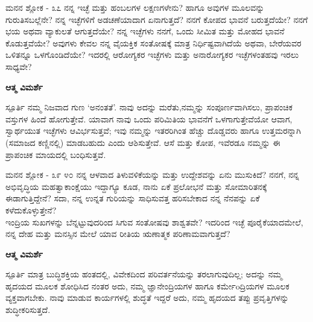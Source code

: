 \begin{mananam}{\mananamfont ಮನನ ಶ್ಲೋಕ - ೩೭}
\mananamtext ನನ್ನ ಇಚ್ಛೆ ಮತ್ತು ಹಂಬಲಗಳ ಲಕ್ಷಣಗಳೇನು? ಹಾಗೂ ಅವುಗಳ ಮೂಲವನ್ನು ಗುರುತಿಸಬಲ್ಲೆನೇ? ನನ್ನ ಇಚ್ಛೆಗಳಿಗೆ ಅಡಚಣೆಯಾದಾಗ ಏನಾಗುತ್ತದೆ? ನನಗೆ ಕೋಪದ ಭಾವನೆ ಬರುತ್ತದೆಯೇ? ನನಗೆ ಭಯ ಅಥವಾ ವ್ಯಾಕುಲತೆ ಆಗುತ್ತದೆಯೇ? ನನ್ನ ಇಚ್ಛೆಗಳು ನನಗೆ, ಒಂದು ಸೀಮಿತ ಮತ್ತು ಮೋಹದ ಭಾವನೆ ಕೊಡುತ್ತವೆಯೇ? ಅವುಗಳು ಕೇವಲ ನನ್ನ ವೈಯಕ್ತಿಕ ಸಂತೋಷಕ್ಕೆ ಮಾತ್ರ ನಿರ್ಧಿಷ್ಟವಾಗಿದೆಯೆ ಅಥವಾ, ಬೇರೆಯವರ ಒಳಿತನ್ನೂ ಒಳಗೊಂಡಿದೆಯೇ? ಇದರಲ್ಲಿ ಆರೋಗ್ಯಕರ ಇಚ್ಛೆಗಳು ಮತ್ತು ಅನಾರೋಗ್ಯಕರ ಇಚ್ಛೆಗಳಂತಹವು ಇರಲು ಸಾಧ್ಯವೇ? 
\end{mananam}
\WritingHand\enspace\textbf{ಆತ್ಮ ವಿಮರ್ಶೆ}\\
\begin{inspiration}{\mananamfont ಸ್ಪೂರ್ತಿ}
\mananamtext ನಮ್ಮ ನಿಜವಾದ ಗುಣ ‘ಅನಂತತೆ’. ನಾವು ಅದನ್ನು ಮರೆತು,ನಮ್ಮನ್ನು ಸಂಪೂರ್ಣವಾಗಿಸಲು, ಪ್ರಾಪಂಚಿಕ ವಸ್ತುಗಳ ಹಿಂದೆ ಹೋಗುತ್ತೇವೆ. ಯಾವಾಗ ನಾವು ಒಂದು ಪರಿಮಿತಿಯ ಭಾವನೆಗೆ ಒಳಗಾಗುತ್ತೇವೆಯೋ ಆವಾಗ, ಸ್ವಾರ್ಥಯುತ ಇಚ್ಛೆಗಳು ಆವಿರ್ಭಸುತ್ತವೆ; ಇವು ನಮ್ಮನ್ನು ಇತರರಿಗಿಂತ ಹೆಚ್ಚು ದೊಡ್ಡವರು ಹಾಗೂ ಉತ್ತಮರನ್ನಾಗಿ (ಸಮಾಜದ ಕಣ್ಣಿನಲ್ಲಿ) ಮಾಡಬಹುದು ಎಂದು ಆಶಿಸುತ್ತೇವೆ. ಆಸೆ ಮತ್ತು ಕೋಪ, ಇವೆರಡೂ ನಮ್ಮನ್ನು ಈ ಪ್ರಾಪಂಚಿಕ ಮಾಯದಲ್ಲಿ ಬಂಧಿಸುತ್ತವೆ.
\end{inspiration}
\newpage

\begin{mananam}{\mananamfont ಮನನ ಶ್ಲೋಕ - ೩೯ ೪೦}
\mananamtext ನನ್ನ ಆಳವಾದ ತಿಳುವಳಿಕೆಯನ್ನು ಮತ್ತು ಉದ್ದೇಶವನ್ನು ಏನು ಮುಸುಕಿದೆ? ನನಗೆ, ನನ್ನ ಅಭಿವೃದ್ಧಿಯ ಮಹತ್ವಾಕಾಂಕ್ಷೆಯು ಇದ್ದಾಗ್ಯೂ ಕೂಡ, ನಾನು ಏಕೆ ಪ್ರಲೋಭನೆ ಮತ್ತು ಸೋಮಾರಿತನಕ್ಕೆ ಈಡಾಗುತ್ತಿದ್ದೇನೆ? ಸದಾ, ನನ್ನ ಉನ್ನತ ಗುರಿಯನ್ನು ಸಾಧಿಸುವತ್ತ ಹರಿಸಬೇಕಾದ ನನ್ನ ನೆನಪನ್ನು ಏಕೆ ಕಳೆದುಕೊಳ್ಳುತ್ತೇನೆ?\\
ಇಂದ್ರಿಯ ಸುಖಗಳನ್ನು ಬೆನ್ನಟ್ಟುವುದರಿಂದ ಸಿಗುವ ಸಂತೋಷವು ಶಾಶ್ವತವೇ? ಇದರಿಂದ ಇಚ್ಛೆ ಪೂರೈಕೆಯಾದಮೇಲೆ, ನನ್ನ ದೇಹ ಮತ್ತು ಮನಸ್ಸಿನ ಮೇಲೆ ಯಾವ ರೀತಿಯ ಋಣಾತ್ಮಕ ಪರಿಣಾಮವಾಗುತ್ತದೆ? 
\end{mananam}
\WritingHand\enspace\textbf{ಆತ್ಮ ವಿಮರ್ಶೆ}\\
\begin{inspiration}{\mananamfont ಸ್ಪೂರ್ತಿ}
\mananamtext ಮಾತ್ರ ಬುದ್ಧಿಶಕ್ತಿಯ ಹಂತದಲ್ಲಿ, ವಿವೇಕದಿಂದ ಪರಿವರ್ತನೆಯನ್ನು ತರಲಾಗುವುದಿಲ್ಲ; ಅದನ್ನು ನಮ್ಮ ಹೃದಯದ ಮೂಲಕ ಶೋಧಿಸಿದ ನಂತರ ಅದು, ನಮ್ಮ ಜ್ಞಾನೇಂದ್ರಿಯಗಳ ಹಾಗೂ ಕರ್ಮೇoದ್ರಿಯಗಳ ಮೂಲಕ  ವ್ಯಕ್ತವಾಗಬೇಕು. ನಾವು ಮಾಡುವ ಕಾರ್ಯಗಳಲ್ಲಿ ಶುದ್ಧತೆ ಇದ್ದರೆ ಅದು, ನಮ್ಮ ಹೃದಯದ ತಪ್ಪು ಪ್ರವೃತ್ತಿಗಳನ್ನು ಶುದ್ಧೀಕರಿಸುತ್ತದೆ.
\end{inspiration}
\newpage

